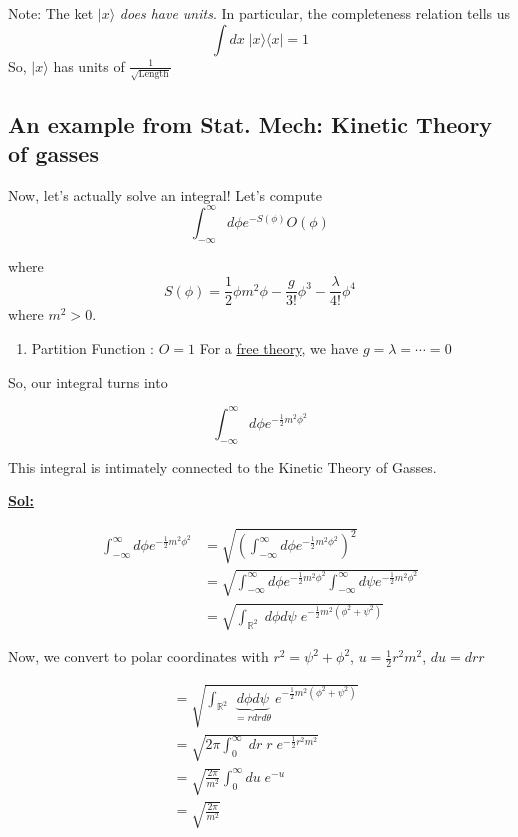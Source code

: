 \documentclass{article}
\newcommand{\ket}[1]{|#1 \rangle}
\newcommand{\bra}[1]{\langle #1|}
\newcommand{\R}{\mathbb{R}}
\begin{document}
\vskip 0.5cm
\begin{dottedbox}
  Note: The ket $\ket{x}$ \emph{does have units}. In particular, the completeness relation tells us 
  \[ \int dx\; \ket{x} \bra{x} = 1\] 
  So, $\ket{x}$ has units of $\frac{1}{\sqrt{\text{Length}}}$
\end{dottedbox}

\subsection{An example from Stat. Mech: Kinetic Theory of gasses}

\vskip 0.5cm
Now, let's actually solve an integral! Let's compute 
\[ \int_{-\infty}^{\infty} d\phi e^{-S(\phi)} O(\phi) \]

where 
\[ S(\phi) = \frac{1}{2} \phi m^2 \phi - \frac{g}{3!} \phi^3 -  \frac{\lambda}{4!}  \phi^4 \] where $m^2 > 0$.

\begin{enumerate}
  \item Partition Function : $O = 1$
  For a \underline{free theory}, we have $g = \lambda = \cdots = 0$
\end{enumerate}

So, our integral turns into 

\[ \boxed{\int_{-\infty}^{\infty} d\phi e^{-\frac{1}{2}m^2 \phi^2}} \]

This integral is intimately connected to the Kinetic Theory of Gasses.

\underline{\textbf{Sol:}}

\begin{align*}
  \int_{-\infty}^{\infty} d\phi e^{-\frac{1}{2}m^2 \phi^2} &= \sqrt{\left( \int_{-\infty}^{\infty} d\phi e^{-\frac{1}{2}m^2 \phi^2} \right)^2} \\
  &= \sqrt{\int_{-\infty}^{\infty} d\phi e^{-\frac{1}{2}m^2 \phi^2} \int_{-\infty}^{\infty} d\psi e^{-\frac{1}{2}m^2 \phi^2}} \\
  &= \sqrt{\int_{\R^2} \;d\phi d\psi\; e^{-\frac{1}{2}m^2(\phi^2 + \psi^2)}} 
\end{align*}

Now, we convert to polar coordinates with $r^2 = \psi^2 + \phi^2$, $u = \frac{1}{2}r^2 m^2$, $du = dr r$

\begin{align*}
  &= \sqrt{\int_{\R^2} \;\underbrace{d\phi d\psi}_{=r dr d\theta}\; e^{-\frac{1}{2}m^2(\phi^2 + \psi^2)}} \\
  &= \sqrt{2\pi \int_0^{\infty} \;dr\;r\;e^{-\frac{1}{2} r^2 m^2 } } \\
  &= \sqrt{\frac{2\pi}{m^2}} \int_0^{\infty} du\;e^{-u} \\
  &= \sqrt{\frac{2\pi}{m^2}}
\end{align*}
\end{document}
